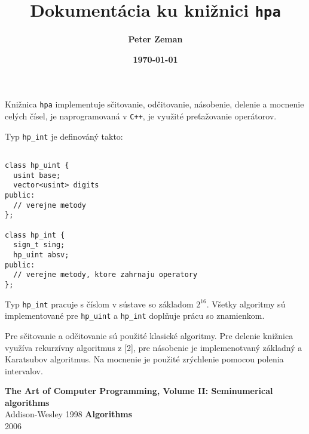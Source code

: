 \documentclass[12pt,a4paper]{article}
\title{\bf Dokumentácia ku knižnici \texttt{hpa}}
\date{\bf\today}
\author{\bf Peter Zeman}
\begin{document}
\maketitle

Knižnica {\tt hpa} implementuje sčitovanie, odčitovanie, násobenie, delenie a
mocnenie celých čísel, je naprogramovaná v {\tt C++}, je využité preťažovanie
operátorov.

Typ {\tt hp\_int} je definováný takto:

\begin{verbatim}

class hp_uint {
  usint base;
  vector<usint> digits
public:
  // verejne metody
};

class hp_int {
  sign_t sing;
  hp_uint absv;
public:
  // verejne metody, ktore zahrnaju operatory
};
\end{verbatim}

Typ {\tt hp\_int} pracuje s číslom v sústave so základom $2^{16}$. Všetky
algoritmy sú implementované pre {\tt hp\_uint} a {\tt hp\_int} doplňuje prácu
so znamienkom.

Pre sčitovanie a odčitovanie sú použité klasické algoritmy. Pre delenie
knižnica využíva rekurzívny algoritmus z [2], pre násobenie je implemenotvaný
základný a Karatsubov algoritmus. Na mocnenie je použité zrýchlenie pomocou
polenia intervalov.

\begin{thebibliography}{9}
	       {\bf The Art of Computer Programming, Volume II: Seminumerical
	       algorithms}\\
	       Addison-Wesley
	       1998
		{\bf Algorithms}\\
		2006
\end{thebibliography}
\end{document}
